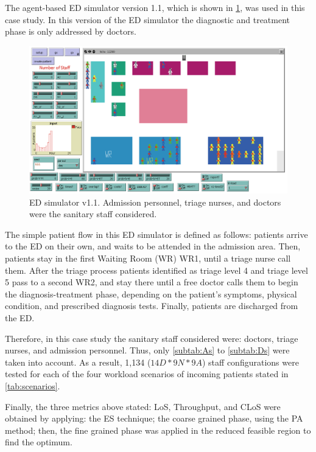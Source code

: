 \documentclass[11pt]{article} %
\begin{document}
The agent-based ED simulator version 1.1, which is shown in \ref{fig:ED-SIM-0},
was used in this case study. In this version of the ED simulator the
diagnostic and treatment phase is only addressed by doctors. 
\begin{figure}[h]
\noindent \begin{centering}
\centering \includegraphics[width=0.9\columnwidth,height=0.16\paperheight]{figs2/ED_Netlogo-0}
\par\end{centering}

\noindent \caption{ED simulator v1.1. Admission personnel, triage nurses, and doctors
were the sanitary staff considered.}

\label{fig:ED-SIM-0} 
\end{figure}
 The simple patient flow in this ED simulator is defined as follows:
patients arrive to the ED on their own, and waits to be attended in
the admission area. Then, patients stay in the first Waiting Room
(WR) WR1, until a triage nurse call them. After the triage process
patients identified as triage level 4 and triage level 5 pass to a
second WR2, and stay there until a free doctor calls them to begin
the diagnosis-treatment phase, depending on the patient's symptoms,
physical condition, and prescribed diagnosis tests. Finally, patients
are discharged from the ED. 

Therefore, in this case study the sanitary staff considered were:
doctors, triage nurses, and admission personnel. Thus, only \ref{subtab:As}
to \ref{subtab:Ds} were taken into account. As a result, 1,134 ($14D*9N*9A$)
staff configurations were tested for each of the four workload scenarios
of incoming patients stated in \ref{tab:scenarios}. 

Finally, the three metrics above stated: LoS, Throughput, and CLoS
were obtained by applying: the ES technique; the coarse grained phase,
using  the PA method; then, the fine
grained phase was applied in the reduced feasible region to find the
optimum.
\end{document}

